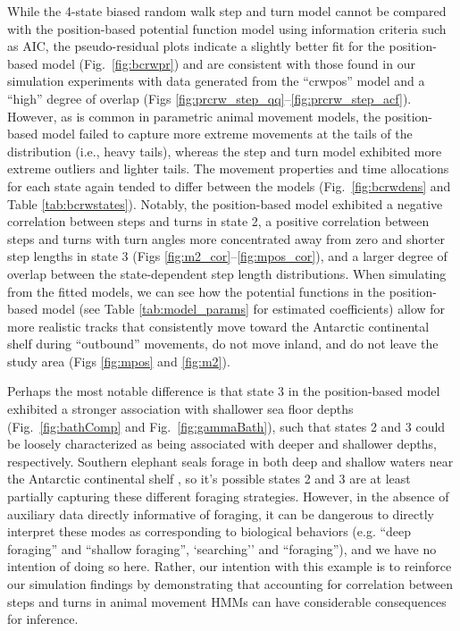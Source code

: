 \documentclass[12pt]{article}\usepackage[]{graphicx}\usepackage[]{xcolor}
\begin{document}
While the 4-state biased random walk step and turn model cannot be compared with the position-based potential function model using information criteria such as AIC, the pseudo-residual plots indicate a slightly better fit for the position-based model (Fig.\ \ref{fig:bcrwpr}) and are consistent with those found in our simulation experiments with data generated from the ``crwpos'' model and a ``high'' degree of overlap (Figs \ref{fig:prcrw_step_qq}--\ref{fig:prcrw_step_acf}). However, as is common in parametric animal movement models, the position-based model failed to capture more extreme movements at the tails of the distribution (i.e., heavy tails), whereas the step and turn model exhibited more extreme outliers and lighter tails. The movement properties and time allocations for each state again tended to differ between the models (Fig.\ \ref{fig:bcrwdens} and Table \ref{tab:bcrwstates}). Notably, the position-based model exhibited a negative correlation between steps and turns in state 2, a positive correlation between steps and turns with turn angles more concentrated away from zero and shorter step lengths in state 3 (Figs \ref{fig:m2_cor}--\ref{fig:mpos_cor}), and a larger degree of overlap between the state-dependent step length distributions. When simulating from the fitted models, we can see how the potential functions in the position-based model (see Table \ref{tab:model_params} for estimated coefficients) allow for more realistic tracks that consistently move toward the Antarctic continental shelf during ``outbound'' movements, do not move inland, and do not leave the study area (Figs \ref{fig:mpos} and \ref{fig:m2}).

Perhaps the most notable difference is that state 3 in the position-based model exhibited a stronger association with shallower sea floor depths (Fig.\ \ref{fig:bathComp} and Fig.\ \ref{fig:gammaBath}), such that states 2 and 3 could be loosely characterized as being associated with deeper and shallower depths, respectively. Southern elephant seals forage in both deep and shallow waters near the Antarctic continental shelf \citep[e.g.][]{mcconnell1992foraging}, so it's possible states 2 and 3 are at least partially capturing these different foraging strategies. However, in the absence of auxiliary data directly informative of foraging, it can be dangerous to directly interpret these modes as corresponding to biological behaviors (e.g. ``deep foraging'' and ``shallow foraging'', `searching'' and ``foraging''), and we have no intention of doing so here. Rather, our intention with this example is to reinforce our simulation findings by demonstrating that accounting for correlation between steps and turns in animal movement HMMs can have considerable consequences for inference.
\end{document}
